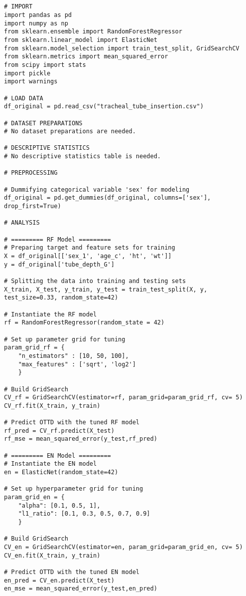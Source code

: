 \documentclass[11pt]{article}
\begin{document}
\begin{verbatim}


# IMPORT
import pandas as pd
import numpy as np
from sklearn.ensemble import RandomForestRegressor
from sklearn.linear_model import ElasticNet
from sklearn.model_selection import train_test_split, GridSearchCV
from sklearn.metrics import mean_squared_error
from scipy import stats
import pickle
import warnings

# LOAD DATA
df_original = pd.read_csv("tracheal_tube_insertion.csv")

# DATASET PREPARATIONS
# No dataset preparations are needed.

# DESCRIPTIVE STATISTICS
# No descriptive statistics table is needed.

# PREPROCESSING 

# Dummifying categorical variable 'sex' for modeling
df_original = pd.get_dummies(df_original, columns=['sex'], drop_first=True)

# ANALYSIS

# ========= RF Model =========
# Preparing target and feature sets for training
X = df_original[['sex_1', 'age_c', 'ht', 'wt']]
y = df_original['tube_depth_G']

# Splitting the data into training and testing sets
X_train, X_test, y_train, y_test = train_test_split(X, y, test_size=0.33, random_state=42)

# Instantiate the RF model
rf = RandomForestRegressor(random_state = 42)

# Set up parameter grid for tuning
param_grid_rf = { 
    "n_estimators" : [10, 50, 100],
    "max_features" : ['sqrt', 'log2']
    }

# Build GridSearch
CV_rf = GridSearchCV(estimator=rf, param_grid=param_grid_rf, cv= 5)
CV_rf.fit(X_train, y_train)

# Predict OTTD with the tuned RF model
rf_pred = CV_rf.predict(X_test)
rf_mse = mean_squared_error(y_test,rf_pred)

# ========= EN Model =========
# Instantiate the EN model
en = ElasticNet(random_state=42)

# Set up hyperparameter grid for tuning
param_grid_en = {
    "alpha": [0.1, 0.5, 1],
    "l1_ratio": [0.1, 0.3, 0.5, 0.7, 0.9]
    }

# Build GridSearch
CV_en = GridSearchCV(estimator=en, param_grid=param_grid_en, cv= 5)
CV_en.fit(X_train, y_train)

# Predict OTTD with the tuned EN model
en_pred = CV_en.predict(X_test)
en_mse = mean_squared_error(y_test,en_pred)


\end{verbatim}
\end{document}
